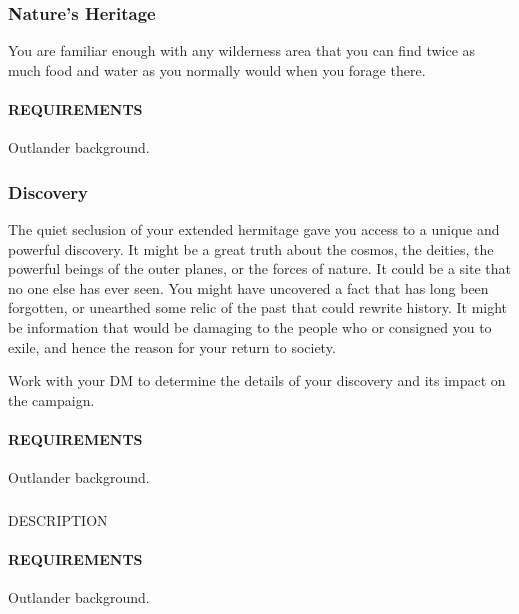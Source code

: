     \subsubsection{Nature's Heritage} \label{feat::naturesheritage}
    You are familiar enough with any wilderness area that you can find twice as much food and water as you normally would when you forage there.
    \paragraph{REQUIREMENTS} Outlander background.

    \subsubsection{Discovery} \label{feat::discovery} %
    The quiet seclusion of your extended hermitage gave you access to a unique and powerful discovery.
    It might be a great truth about the cosmos, the deities, the powerful beings of the outer planes, or the forces of nature.
    It could be a site that no one else has ever seen.
    You might have uncovered a fact that has long been forgotten, or unearthed some relic of the past that could rewrite history.
    It might be information that would be damaging to the people who or consigned you to exile, and hence the reason for your return to society.

    Work with your DM to determine the details of your discovery and its impact on the campaign.
    \paragraph{REQUIREMENTS} Outlander background.

    \subsubsection{} \label{feat::NAME}
    DESCRIPTION
    \paragraph{REQUIREMENTS} Outlander background.


